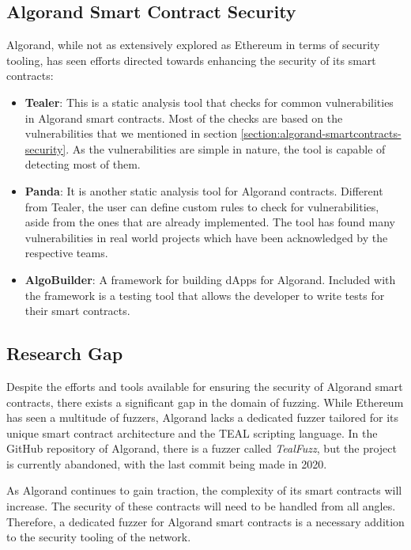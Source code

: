 \subsection*{Algorand Smart Contract Security}
Algorand, while not as extensively explored as Ethereum in terms of security tooling, has seen efforts directed towards enhancing the security of its smart contracts:
\begin{itemize}
    \item \textbf{Tealer}: This is a static analysis tool that checks for common vulnerabilities in Algorand smart contracts.
          Most of the checks are based on the vulnerabilities that we mentioned in section \ref{section:algorand-smartcontracts-security}.
          As the vulnerabilities are simple in nature, the tool is capable of detecting most of them.

    \item \textbf{Panda}: It is another static analysis tool for Algorand contracts.
          Different from Tealer, the user can define custom rules to check for vulnerabilities, aside from the ones that are already implemented.
          The tool has found many vulnerabilities in real world projects which have been acknowledged by the respective teams.
    \item \textbf{AlgoBuilder}: A framework for building \acp{dApp} for Algorand.
          Included with the framework is a testing tool that allows the developer to write tests for their smart contracts.
\end{itemize}

\subsection*{Research Gap}
Despite the efforts and tools available for ensuring the security of Algorand smart contracts, there exists a significant gap in the domain of fuzzing.
While Ethereum has seen a multitude of fuzzers, Algorand lacks a dedicated fuzzer tailored for its unique smart contract architecture and the \ac{TEAL} scripting language.
In the GitHub repository of Algorand, there is a fuzzer called \textit{TealFuzz}, but the project is currently abandoned, with the last commit being made in 2020.

As Algorand continues to gain traction, the complexity of its smart contracts will increase.
The security of these contracts will need to be handled from all angles.
Therefore, a dedicated fuzzer for Algorand smart contracts is a necessary addition to the security tooling of the network.